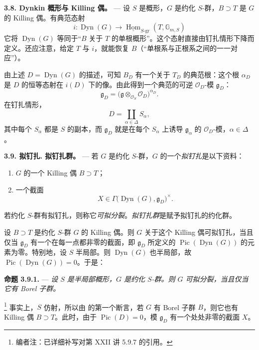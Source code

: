 \medskip\noindent\textbf{3.8. Dynkin 概形与 Killing 偶。} ---
设 \(S\) 是概形，\(G\) 是约化 \(S\)-群，\(B\supset T\) 是 \(G\) 的 Killing 偶。有典范态射
\[
  i:\operatorname{Dyn}(G)
  \longrightarrow
  \underline{\operatorname{Hom}}_{S\text{-}\mathrm{gr}}
    (T,\mathbb G_{m,S})
\]
它将 \(\operatorname{Dyn}(G)\) 等同于“\(B\) 关于 \(T\) 的单根概形”。这个态射直接由钉扎情形下降而定义。还应注意，给定 \(T\) 与 \(i\)，就能恢复 \(B\)（“单根系与正根系之间的一一对应”）。

由上述 \(D=\operatorname{Dyn}(G)\) 的描述，可知 \(B_D\) 有一个关于 \(T_D\) 的典范根：这个根 \(\alpha_D\) 是 \(D\) 的恒等态射在 \(i(D)\) 下的像。由此得到一个典范的可逆 \(\mathcal O_D\)-模 \(\mathfrak g_D\)：
\[
  \mathfrak g_D
  =
  \bigl(\mathfrak g\otimes_{\mathcal O_S}\mathcal O_D\bigr)^{\alpha_D}.
\]
在钉扎情形，
\[
  D=\coprod_{\alpha\in\Delta}S_\alpha,
\]
其中每个 \(S_\alpha\) 都是 \(S\) 的副本，而 \(\mathfrak g_D\) 就是在每个 \(S_\alpha\) 上诱导 \(\mathfrak g_\alpha\) 的 \(\mathcal O_D\)-模，\(\alpha\in\Delta\)。

\medskip\noindent\textbf{3.9. 拟钉扎. 拟钉扎群。} ---
若 \(G\) 是约化 \(S\)-群，\(G\) 的一个\emph{拟钉扎}是以下资料：
\begin{enumerate}
\item[(i)] \(G\) 的一个 Killing 偶 \(B\supset T\)；
\item[(ii)] 一个截面
\[
  X\in\Gamma\bigl(\operatorname{Dyn}(G),\mathfrak g_D\bigr)^\times.
\]
\end{enumerate}
若约化 \(S\)-群有拟钉扎，则称它\emph{可拟分裂}。\emph{拟钉扎群}是赋予拟钉扎的约化群。

设 \(B\supset T\) 是约化 \(S\)-群 \(G\) 的 Killing 偶。则 \(G\) 关于这个 Killing 偶可拟钉扎，当且仅当 \(\mathfrak g_D\) 有一个在每一点都非零的截面，即 \(\mathfrak g_D\) 所定义的 \(\operatorname{Pic}(\operatorname{Dyn}(G))\) 的元素为零。特别地，设 \(S\) 半局部。则 \(\operatorname{Dyn}(G)\) 也半局部，故 \(\operatorname{Pic}(\operatorname{Dyn}(G))=0\)。于是：

\medskip\noindent\textbf{命题 3.9.1.} ---
{\itshape 设 \(S\) 是半局部概形，\(G\) 是约化 \(S\)-群。则 \(G\) 可拟分裂，当且仅当它有 Borel 子群。}

\footnote{编者注：已详细补写对第 XXII 讲 5.9.7 的引用。}
事实上，\(S\) 仿射，所以由 的第一个断言，若 \(G\) 有 Borel 子群 \(B\)，则它也有 Killing 偶 \(B\supset T\)。此时，由于 \(\operatorname{Pic}(D)=0\)，模 \(\mathfrak g_D\) 有一个处处非零的截面 \(X\)。

